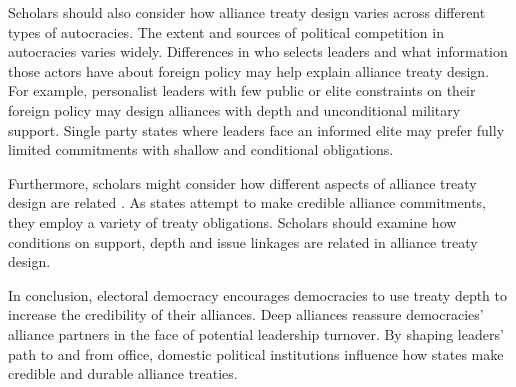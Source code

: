 \documentclass[12pt]{article}
\begin{document}
Scholars should also consider how alliance treaty design varies across different types of autocracies. 
The extent and sources of political competition in autocracies varies widely. 
Differences in who selects leaders and what information those actors have about foreign policy \citep{Weeks2008} may help explain alliance treaty design.
For example, personalist leaders with few public or elite constraints on their foreign policy may design alliances with depth and unconditional military support. 
Single party states where leaders face an informed elite may prefer fully limited commitments with shallow and conditional obligations. 


Furthermore, scholars might consider how different aspects of alliance treaty design are related \citep{FjelstulReiter2019}. 
As states attempt to make credible alliance commitments, they employ a variety of treaty obligations. 
Scholars should examine how conditions on support, depth and issue linkages are related in alliance treaty design. 


In conclusion, electoral democracy encourages democracies to use treaty depth to increase the credibility of their alliances. 
Deep alliances reassure democracies' alliance partners in the face of potential leadership turnover. 
By shaping leaders' path to and from office, domestic political institutions influence how states make credible and durable alliance treaties.




 
 
\end{document}
